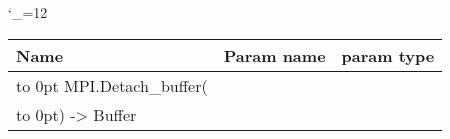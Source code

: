 \begingroup \catcode`\_=12 \tt
\begin{tabular}{lll}
\toprule
\textrm{Name}&\textrm{Param name}&\textrm{param type}\\
\midrule
\hbox to 0pt {MPI.Detach_buffer(\hss}\\
\hbox to 0pt{) -> Buffer\hss}\\
\bottomrule
\end{tabular}
\endgroup
